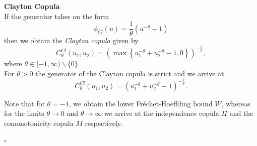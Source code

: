 \textbf{Clayton Copula}\\
If the generator takes on the form
\begin{equation}
\phi_{C l}(u)=\frac{1}{\theta}\left(u^{-\theta}-1\right)
\end{equation}
then we obtain the \textit{Clayton copula} given by
\begin{equation}
C_{\theta}^{C l}\left(u_{1}, u_{2}\right)=\left(\max \left\{u_{1}^{-\theta}+u_{2}^{-\theta}-1,0\right\}\right)^{-\frac{1}{\theta}},
\end{equation}
where $\theta \in[-1, \infty) \backslash\{0\}$.\\
For $\theta > 0$ the generator of the Clayton copula is strict and we arrive at 
\begin{equation}
C_{\theta}^{C l}\left(u_{1}, u_{2}\right)= (u_{1}^{-\theta}+u_{2}^{-\theta}-1)^{-\frac{1}{\theta}}.
\end{equation}

Note that for $\theta=-1$, we obtain the lower Fr\'echet-Hoeffding bound $W$, whereas for the limits $\theta \rightarrow 0$ and $\theta \rightarrow \infty$ we arrive at the independence copula $\Pi$ and the comonotonicity copula $M$ respectively.

\hfill $\square$ \\




